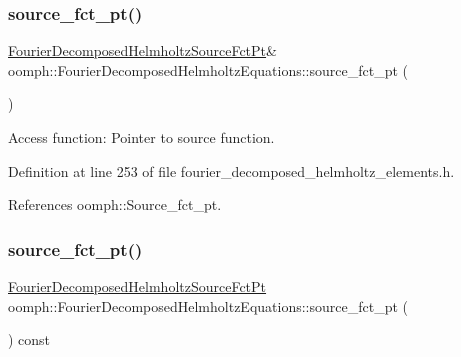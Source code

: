 \subsubsection{\texorpdfstring{source\+\_\+fct\+\_\+pt()}{source\_fct\_pt()}\hspace{0.1cm}{\footnotesize\ttfamily [1/2]}}
{\footnotesize\ttfamily \hyperlink{classoomph_1_1FourierDecomposedHelmholtzEquations_a66a39c7967ffeedd994c206e2a5f0d4e}{Fourier\+Decomposed\+Helmholtz\+Source\+Fct\+Pt}\& oomph\+::\+Fourier\+Decomposed\+Helmholtz\+Equations\+::source\+\_\+fct\+\_\+pt (\begin{DoxyParamCaption}{ }\end{DoxyParamCaption})\hspace{0.3cm}{\ttfamily [inline]}}



Access function\+: Pointer to source function. 



Definition at line 253 of file fourier\+\_\+decomposed\+\_\+helmholtz\+\_\+elements.\+h.



References oomph\+::\+Source\+\_\+fct\+\_\+pt.

\mbox{\label{classoomph_1_1FourierDecomposedHelmholtzEquations_aa269e954c4deb57296defd467c90c7bc}} 
\subsubsection{\texorpdfstring{source\+\_\+fct\+\_\+pt()}{source\_fct\_pt()}\hspace{0.1cm}{\footnotesize\ttfamily [2/2]}}
{\footnotesize\ttfamily \hyperlink{classoomph_1_1FourierDecomposedHelmholtzEquations_a66a39c7967ffeedd994c206e2a5f0d4e}{Fourier\+Decomposed\+Helmholtz\+Source\+Fct\+Pt} oomph\+::\+Fourier\+Decomposed\+Helmholtz\+Equations\+::source\+\_\+fct\+\_\+pt (\begin{DoxyParamCaption}{ }\end{DoxyParamCaption}) const\hspace{0.3cm}{\ttfamily [inline]}}



